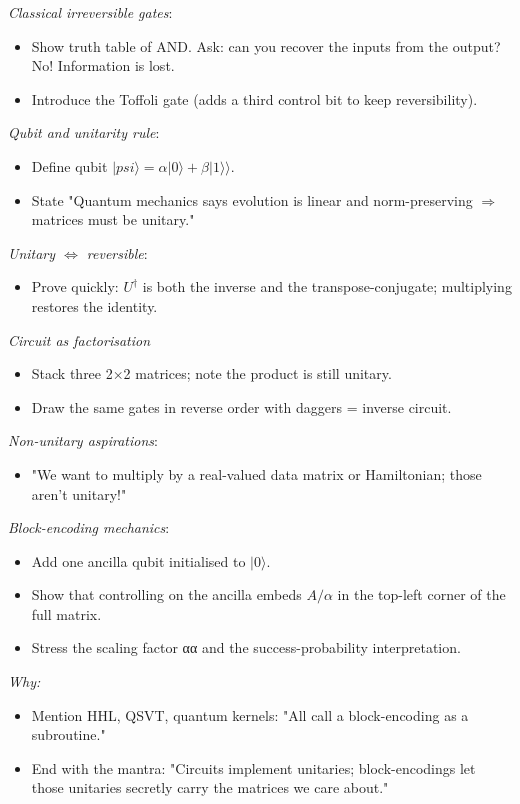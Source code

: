 \emph{Classical irreversible gates}: 
\begin{itemize}
	\item Show truth table of AND. Ask: can you recover the inputs from the output? No! Information is lost.
	\item Introduce the Toffoli gate (adds a third control bit to keep reversibility).
\end{itemize}

\emph{Qubit and unitarity rule}:
\begin{itemize}
	\item Define qubit $|psi\rangle = \alpha |0\rangle + \beta |1\rangle⟩$.
\item State "Quantum mechanics says evolution is linear and norm-preserving $\Rightarrow$ matrices must be unitary."
\end{itemize}

\emph{Unitary $\iff$ reversible}:
\begin{itemize}
	\item Prove quickly: $U^\dag$ is both the inverse and the transpose-conjugate; multiplying restores the identity.
\end{itemize}

\emph{Circuit as factorisation}
\begin{itemize}
	\item Stack three 2×2 matrices; note the product is still unitary.
	\item Draw the same gates in reverse order with daggers = inverse circuit.
\end{itemize}

\emph{Non-unitary aspirations}:
\begin{itemize}
	\item "We want to multiply by a real-valued data matrix or Hamiltonian; those aren't unitary!"
\end{itemize}

\emph{Block-encoding mechanics}:
\begin{itemize}
	\item Add one ancilla qubit initialised to $|0\rangle$.
	\item Show that controlling on the ancilla embeds $A/\alpha$ in the top-left corner of the full matrix.
	\item Stress the scaling factor αα and the success-probability interpretation.
\end{itemize}

\emph{Why:}
\begin{itemize}
	\item Mention HHL, QSVT, quantum kernels: "All call a block-encoding as a subroutine."
	\item End with the mantra: "Circuits implement unitaries; block-encodings let those unitaries secretly carry the matrices we care about."
\end{itemize}

